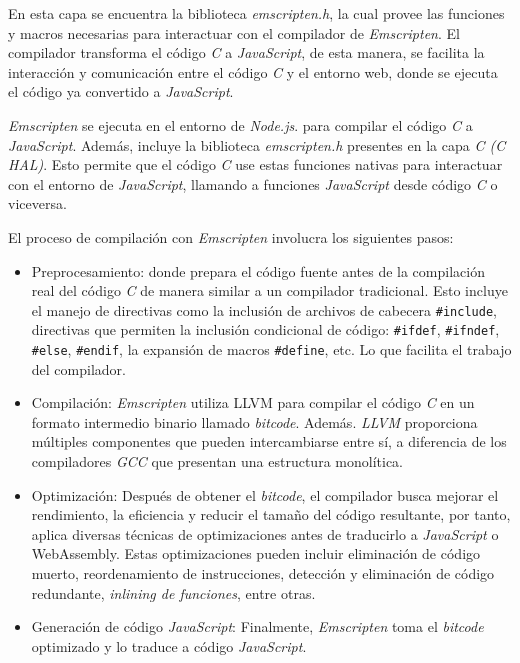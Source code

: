 En esta capa se encuentra la biblioteca \textit{emscripten.h}, la cual provee las funciones y macros necesarias para interactuar con el compilador de \textit{Emscripten}. El compilador transforma el código \textit{C} a \textit{JavaScript}, de esta manera, se facilita la interacción y comunicación entre el código \textit{C} y el entorno web, donde se ejecuta el código ya convertido a \textit{JavaScript}.


\textit{Emscripten} se ejecuta en el entorno de \textit{Node.js}. para compilar el código \textit{C} a \textit{JavaScript}. Además, incluye la biblioteca \textit{emscripten.h} presentes en la capa \textit{C (C HAL)}. Esto permite que el código \textit{C} use estas funciones nativas para interactuar con el entorno de \textit{JavaScript}, llamando a funciones \textit{JavaScript} desde código \textit{C} o viceversa.

El proceso de compilación con \textit{Emscripten} involucra los siguientes pasos:

\begin{itemize}
	\item Preprocesamiento: donde prepara el código fuente antes de la compilación real del código \textit{C} de manera similar a un compilador tradicional. Esto incluye el manejo de directivas como la inclusión de archivos de cabecera \texttt{\#include}, directivas que permiten la inclusión condicional de código: \newline \texttt{\#ifdef}, \texttt{\#ifndef}, \texttt{\#else}, \texttt{\#endif}, la expansión de macros \texttt{\#define}, etc. Lo que facilita el trabajo del compilador.
	
	\item Compilación: \textit{Emscripten} utiliza LLVM para compilar el código \textit{C} en un formato intermedio binario llamado  \textit{bitcode}. 
Además. \textit{LLVM} proporciona múltiples componentes que pueden intercambiarse entre sí, a diferencia de los compiladores \textit{GCC} que presentan una estructura monolítica. 

	\item Optimización: Después de obtener el \textit{bitcode}, el compilador busca mejorar el rendimiento, la eficiencia y reducir el tamaño del código resultante, por tanto,  aplica diversas técnicas de optimizaciones antes de traducirlo a \textit{JavaScript} o WebAssembly. Estas optimizaciones pueden incluir eliminación de código muerto, reordenamiento de instrucciones, detección y eliminación de código redundante, \textit{inlining de funciones}, entre otras.
	
	\item Generación de código \textit{JavaScript}: Finalmente, \textit{Emscripten} toma el \textit{bitcode} optimizado y lo traduce a código \textit{JavaScript}.

\end{itemize}


